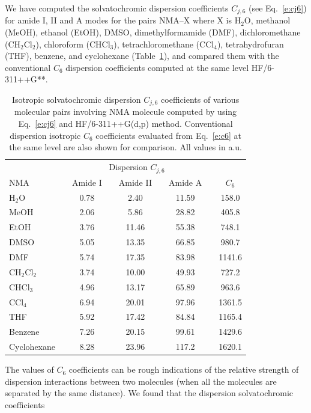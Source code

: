 \documentclass[a4paper,titlepage,twoside,fleqn,12pt]{book}
\begin{document}
\begin{refsection}
We have computed the solvatochromic dispersion coefficients
$C_{j,6}$ (see Eq.~\eqref{e:cj6}) for amide I, II and A modes for the pairs NMA--X
where X is H$_2$O, methanol (MeOH), ethanol (EtOH), DMSO,
dimethylformamide (DMF), dichloromethane (CH$_2$Cl$_2$), chloroform
(CHCl$_3$), tetrachloromethane (CCl$_4$), tetrahydrofuran
(THF), benzene, and cyclohexane (Table~\ref{t:cj6}),
and compared them with the conventional $C_6$ dispersion coefficients
computed at the same level HF/6-311++G**. 
%
\begin{table}[t!]
\caption{
Isotropic solvatochromic dispersion $C_{j,6}$ coefficients of various
molecular pairs involving NMA molecule computed
by using Eq.~\eqref{e:cj6} and HF/6-311++G(d,p) method. Conventional dispersion
isotropic $C_6$ coefficients evaluated from Eq.~\eqref{e:c6} at the same level are also
shown for comparison. All values in a.u.
\label{t:cj6}}
\begin{tabular*}{1.0\textwidth}{@{\extracolsep{\fill} } l cccccccc }
\hline\hline
 && \multicolumn{5}{c}{Dispersion $C_{j,6}$} && \\
\cline{3-7}
NMA && Amide I && Amide II && Amide A && $C_6$ \\
\hline
H$_2$O       && 0.78 && 2.40  && 11.59 && 158.0 \\
MeOH         && 2.06 && 5.86  && 28.82 && 405.8 \\
EtOH         && 3.76 && 11.46 && 55.38 && 748.1 \\
DMSO         && 5.05 && 13.35 && 66.85 && 980.7 \\
DMF          && 5.74 && 17.35 && 83.98 && 1141.6 \\
CH$_2$Cl$_2$ && 3.74 && 10.00 && 49.93 && 727.2 \\
CHCl$_3$     && 4.96 && 13.17 && 65.89 && 963.6 \\
CCl$_4$      && 6.94 && 20.01 && 97.96 && 1361.5 \\
THF          && 5.92 && 17.42 && 84.84 && 1165.4 \\
Benzene      && 7.26 && 20.15 && 99.61 && 1429.6 \\
Cyclohexane  && 8.28 && 23.96 && 117.2 && 1620.1 \\
\hline\hline
\end{tabular*}
\end{table}
%
The values of $C_6$ coefficients
can
be rough indications of the relative strength of dispersion interactions
between two molecules (when all the molecules are separated by the same
distance). We found that the dispersion solvatochromic coefficients

\end{refsection}
\end{document}
